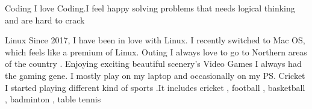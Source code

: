




\begin{cvskills}
  \cvskill
    {Coding} %
    {I love Coding.I feel happy solving problems that needs logical thinking and are hard to crack} %

  \cvskill
    {Linux} %
    {Since 2017, I have been in love with Linux. I recently switched to Mac OS, which feels like a premium of Linux.} %
  \cvskill
    {Outing} %
    {I always love to go to Northern areas of the country . Enjoying exciting beautiful scenery's } %
  \cvskill
    {Video Games} %
    {I always had the gaming gene. I mostly play on my laptop and occasionally on my PS.} %
  \cvskill
    {Cricket} %
    {I started playing different kind of sports .It includes cricket , football , basketball , badminton , table tennis  } %

\end{cvskills}
